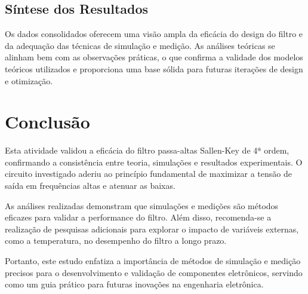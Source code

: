 \documentclass[
	12pt,				%
	openright,			%
	twoside,			%
	a4paper,			%
	english,			%
	french,				%
	spanish,			%
	brazil,				%
	]{abntex2}
\begin{document}
\section{Síntese dos Resultados}

Os dados consolidados oferecem uma visão ampla da eficácia do design do filtro e da adequação das técnicas de simulação e medição. As análises teóricas se alinham bem com as observações práticas, o que confirma a validade dos modelos teóricos utilizados e proporciona uma base sólida para futuras iterações de design e otimização.



\chapter{Conclusão}

Esta atividade validou a eficácia do filtro passa-altas Sallen-Key de 4ª ordem, confirmando a consistência entre teoria, simulações e resultados experimentais. O circuito investigado aderiu ao princípio fundamental de maximizar a tensão de saída em frequências altas e atenuar as baixas.

As análises realizadas demonstram que simulações e medições são métodos eficazes para validar a performance do filtro. Além disso, recomenda-se a realização de pesquisas adicionais para explorar o impacto de variáveis externas, como a temperatura, no desempenho do filtro a longo prazo.

Portanto, este estudo enfatiza a importância de métodos de simulação e medição precisos para o desenvolvimento e validação de componentes eletrônicos, servindo como um guia prático para futuras inovações na engenharia eletrônica.




\clearpage

\end{document}

